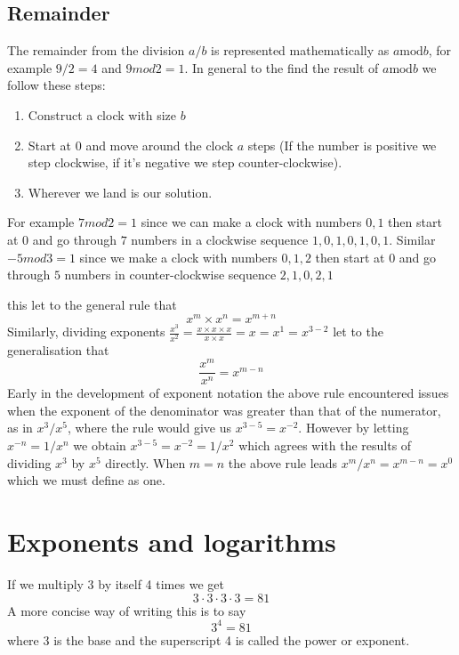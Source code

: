\subsection{Remainder}
The remainder from the division $a/b$ is represented mathematically as $a \textrm{mod} b$, for example $9/2 = 4$ and $9 mod 2 = 1$. In general to the find the result of $a \textrm{mod} b$ we follow these steps:
\begin{enumerate}
\item Construct a clock with size $b$
\item Start at 0 and move around the clock $a$ steps (If the number is positive we step clockwise, if it's negative we step counter-clockwise).
\item Wherever we land is our solution.
\end{enumerate}
For example $7 mod 2 = 1$ since we can make a clock with numbers $0,1$ then start at $0$ and go through $7$ numbers in a clockwise sequence $1,0,1,0,1,0,1$. Similar $-5 mod 3 = 1$ since we make a clock with numbers $0,1,2$ then start at $0$ and go through $5$ numbers in counter-clockwise sequence  $2,1,0,2,1$

this let to the general rule that
\[
x^m \times x^n = x^{m+n}
\]
Similarly, dividing exponents $\frac{x^3}{x^2} = \frac{x \times x \times x}{x \times x} = x = x^1 = x^{3-2}$ let to the generalisation that 
\[
\frac{x^m}{x^n} = x^{m-n}
\]
Early in the development of exponent notation the above rule encountered issues when the exponent of the denominator was greater than that of the numerator, as in $x^3/x^5$, where the rule would give us $x^{3-5} = x^{-2}$. However by letting $x^{-n} = 1/x^n$ we obtain $x^{3-5} = x^{-2} = 1/x^2$ which agrees with the results of dividing $x^3$ by $x^5$ directly. When $m = n$ the above rule leads $x^m/x^n = x^{m-n} = x^0$ which we must define as one. 

\section{Exponents and logarithms}\label{arit:exp}
If we multiply 3 by itself 4 times we get
\[
3 \cdot 3 \cdot 3 \cdot 3 = 81
\]
A more concise way of writing this is to say
\[
3^4 = 81
\]
where 3 is the base and the superscript 4 is called the power or exponent.


